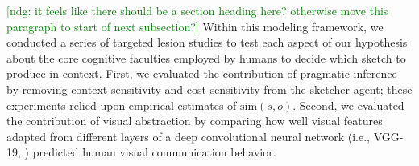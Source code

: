 \documentclass[9pt,twocolumn,twoside]{pnas-new}
\newcommand{\ndg}[1]{\textcolor{Green}{[ndg: #1]}}
\begin{document}


\ndg{it feels like there should be a section heading here? otherwise move this paragraph to start of next subsection?}
Within this modeling framework, we conducted a series of targeted lesion studies to test each aspect of our hypothesis about the core cognitive faculties employed by humans to decide which sketch to produce in context. 
First, we evaluated the contribution of pragmatic inference by removing context sensitivity and cost sensitivity from the sketcher agent; these experiments relied upon empirical estimates of $\textrm{sim}(s,o)$. 
Second, we evaluated the contribution of visual abstraction by comparing how well visual features adapted from different layers of a deep convolutional neural network (i.e., VGG-19, \cite{simonyan2014very}) predicted human visual communication behavior. 
\end{document}
